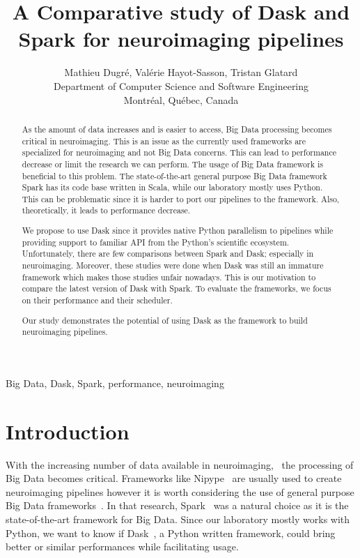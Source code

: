 \documentclass[conference]{IEEEtran}
\begin{document}
\title{A Comparative study of Dask and Spark for neuroimaging pipelines}

\author{Mathieu Dugr\'e, Val\'erie Hayot-Sasson, Tristan Glatard\\
Department of Computer Science and Software Engineering\\
Montr\'eal, Qu\'ebec, Canada
}

\maketitle

\begin{abstract}
As the amount of data increases and is easier to access, Big Data processing becomes
critical in neuroimaging.
This is an issue as the currently used frameworks are specialized for neuroimaging
and not Big Data concerns. This can lead to performance decrease or limit the
research we can perform.
The usage of Big Data framework is beneficial to this problem. The state-of-the-art
general purpose Big Data framework Spark has its code base written in Scala, while
our laboratory mostly uses Python. This can be problematic since it is harder to port
our pipelines to the framework. Also, theoretically, it leads to performance decrease.

We propose to use Dask since it provides native Python parallelism to pipelines while
providing support to familiar API from the Python's scientific ecosystem.
Unfortunately, there are few comparisons between Spark and Dask; especially in
neuroimaging. Moreover, these studies were done when Dask was still an immature
framework which makes those studies unfair nowadays. This is our motivation to
compare the latest version of Dask with Spark.
To evaluate the frameworks, we focus on their performance and their scheduler.

Our study demonstrates the potential of using Dask as the framework to build
neuroimaging pipelines.
\end{abstract}

\begin{IEEEkeywords}
Big Data, Dask, Spark, performance, neuroimaging
\end{IEEEkeywords}

\section{Introduction}
With the increasing number of data available in neuroimaging,~\cite{ALFAROALMAGRO:18,
UKBioBank:18} the processing of Big Data becomes critical. Frameworks like
Nipype~\cite{Nipype:11} are usually used to create neuroimaging pipelines however it
is worth considering the use of general purpose Big Data
frameworks~\cite{Hayot-Sasson:17}. In that research, Spark~\cite{Spark:16} was a
natural choice as it is the state-of-the-art framework for Big Data. Since our
laboratory mostly works with Python, we want to know if Dask~\cite{Dask:15}, a Python
written framework, could bring better or similar performances while facilitating
usage.
\end{document}
